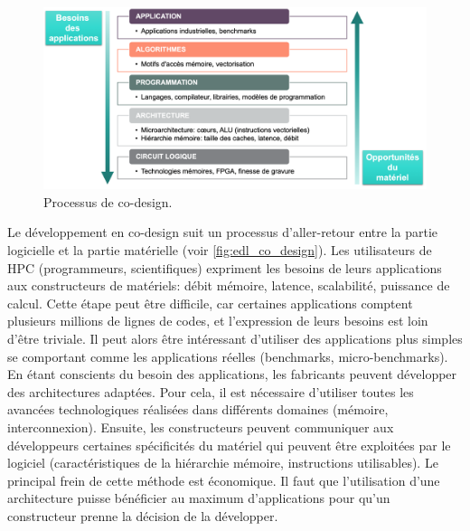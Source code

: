         \begin{figure}
        \center
        \includegraphics[width=14cm]{images/edl_co_design.png}
        \caption{\label{fig:edl_co_design} Processus de co-design.}
        \end{figure}
        
        Le développement en co-design suit un processus d'aller-retour entre la partie logicielle et la partie matérielle (voir \autoref{fig:edl_co_design}). Les utilisateurs de HPC (programmeurs, scientifiques) expriment les besoins de leurs applications aux constructeurs de matériels: débit mémoire, latence, scalabilité, puissance de calcul. Cette étape peut être difficile, car certaines applications comptent plusieurs millions de lignes de codes, et l'expression de leurs besoins est loin d'être triviale. Il peut alors être intéressant d'utiliser des applications plus simples se comportant comme les applications réelles (benchmarks, micro-benchmarks). 
        En étant conscients du besoin des applications, les fabricants peuvent développer des architectures adaptées. Pour cela, il est nécessaire d'utiliser toutes les avancées technologiques réalisées dans différents domaines (mémoire, interconnexion). Ensuite, les constructeurs peuvent communiquer aux développeurs certaines spécificités du matériel qui peuvent être exploitées par le logiciel (caractéristiques de la hiérarchie mémoire, instructions utilisables). Le principal frein de cette méthode est économique. Il faut que l'utilisation d'une architecture puisse bénéficier au maximum d'applications pour qu'un constructeur prenne la décision de la développer.
        
